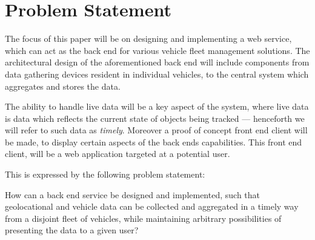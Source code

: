 \section{Problem Statement}\label{sec:problem_statement}

The focus of this paper will be on designing and implementing a web service,
which can act as the back end for various vehicle fleet management solutions.
The architectural design of the aforementioned back end will include components
from data gathering devices resident in individual vehicles,
to the central system which aggregates and stores the data.

The ability to handle live data will be a key aspect of the system,
where live data is data which reflects the current state of objects being tracked
--- henceforth we will refer to such data as \textit{timely}.
Moreover a proof of concept front end client will be made,
to display certain aspects of the back ends capabilities.
This front end client, will be a web application targeted at a potential user.

\bigskip\noindent
This is expressed by the following problem statement:

\medskip
{\addtolength{\leftskip}{10mm}\addtolength{\rightskip}{10mm}\noindent\hrulefill\it

\noindent How can a back end service be designed and implemented,
such that geolocational and vehicle data can be collected and aggregated in a timely way from a disjoint fleet of vehicles,
while maintaining arbitrary possibilities of presenting the data to a given user?

\noindent\hrulefill

}

